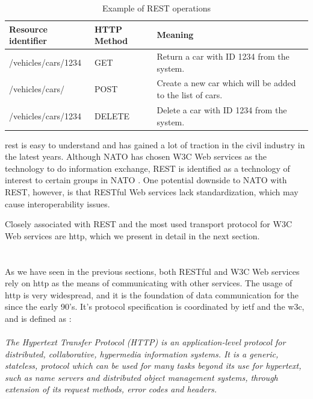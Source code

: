  \begin{table}[h]
 \begin{tabularx}{\textwidth}{| X | X | X |}
 \hline
   \textbf{Resource identifier} & \textbf{HTTP Method}  & \textbf{Meaning}\\ \hline
   /vehicles/cars/1234 & GET & Return a car with ID 1234 from the system. \\ \hline
   /vehicles/cars/ & POST & Create a new car which will be added to the list of cars. \\ \hline
   /vehicles/cars/1234 & DELETE & Delete a car with ID 1234 from the system. \\ \hline
 \end{tabularx}
 \caption{Example of REST operations}
 \label{table-rest}
 \end{table}

 \gls{rest} is easy to understand and has gained a lot of traction in the civil
 industry in the latest years. Although NATO has chosen W3C Web services as the
 technology to do information exchange, REST is identified as a technology of
 interest to certain groups in NATO \cite{johnsen-recommendations}. One potential
 downside to NATO with REST, however, is that RESTful Web services lack
 standardization, which may cause interoperability issues.

Closely associated with REST and the most used transport protocol for W3C Web
services are \gls{http}, which we present in detail in the next section.


\section{}

As we have seen in the previous sections, both RESTful and W3C Web services rely
on \gls{http} as the means of communicating with other services. The usage of
\gls{http} is very widespread, and it is the foundation of data communication
for the  since the early 90's. It's protocol specification is
coordinated by \gls{ietf} and the \gls{w3c}, and is defined as \cite{rfc-2616}:

\paragraph{}
\textit{
    The Hypertext Transfer Protocol (HTTP) is an application-level
    protocol for distributed, collaborative, hypermedia information
    systems. It is a generic, stateless, protocol which can be used for
    many tasks beyond its use for hypertext, such as name servers and
    distributed object management systems, through extension of its
    request methods, error codes and headers.
}

